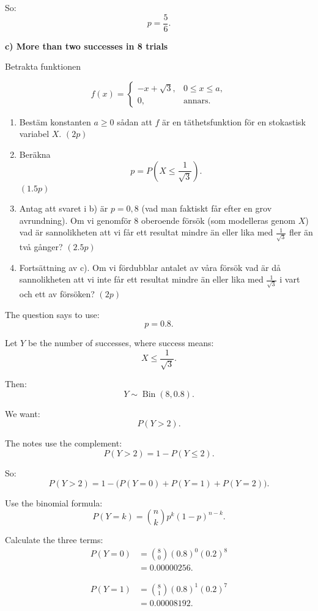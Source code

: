 \documentclass[10pt]{article}
\begin{document}
So:
\[
p=\frac{5}{6}.
\]

\textbf{c) More than two successes in 8 trials}

Betrakta funktionen

\[
f(x)=
\begin{cases}
-x+\sqrt{3},
& 0\le x\le a,\\
0,
& \text{annars}.
\end{cases}
\]

\begin{enumerate}[label=\alph*)]
\item Bestäm konstanten \(a\ge 0\) sådan att
\(f\) är en täthetsfunktion för en stokastisk
variabel \(X\). \((2p)\)

\item Beräkna
\[
p=P\left(X\le \frac{1}{\sqrt{3}}\right).
\]
\((1.5p)\)

\item Antag att svaret i b) är \(p=0,8\)
(vad man faktiskt får efter en grov avrundning).
Om vi genomför 8 oberoende försök
(som modelleras genom \(X\)) vad är sannolikheten
att vi får ett resultat mindre än eller lika med
\(\frac{1}{\sqrt{3}}\) fler än två gånger?
\((2.5p)\)

\item Fortsättning av c). Om vi fördubblar antalet
av våra försök vad är då sannolikheten att vi inte
får ett resultat mindre än eller lika med
\(\frac{1}{\sqrt{3}}\) i vart och ett av försöken?
\((2p)\)
\end{enumerate}

The question says to use:
\[
p=0.8.
\]

Let \(Y\) be the number of successes, where success
means:
\[
X\le \frac{1}{\sqrt{3}}.
\]

Then:
\[
Y\sim \operatorname{Bin}(8,0.8).
\]

We want:
\[
P(Y>2).
\]

The notes use the complement:
\[
P(Y>2)=1-P(Y\le 2).
\]

So:
\[
P(Y>2)
=
1-
\bigl(
P(Y=0)+P(Y=1)+P(Y=2)
\bigr).
\]

Use the binomial formula:
\[
P(Y=k)
=
\binom{n}{k}
p^k(1-p)^{n-k}.
\]

Calculate the three terms:
\begin{align*}
P(Y=0)
&=
\binom{8}{0}
(0.8)^0(0.2)^8
\\[2mm]
&=
0.00000256.
\end{align*}

\begin{align*}
P(Y=1)
&=
\binom{8}{1}
(0.8)^1(0.2)^7
\\[2mm]
&=
0.00008192.
\end{align*}
\end{document}
